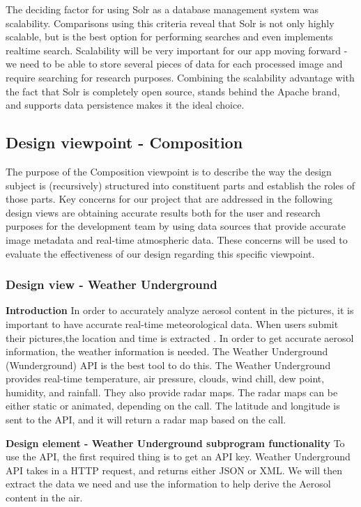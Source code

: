 \documentclass[onecolumn, draftclsnofoot,10pt, compsoc]{IEEEtran}
\begin{document}
\begin{flushleft}
\medskip

The deciding factor for using Solr as a database management system was scalability. Comparisons using this criteria reveal that Solr is not only highly scalable, but is the best option for performing searches and even implements realtime search. \cite{5} Scalability will be very important for our app moving forward - we need to be able to store several pieces of data for each processed image and require searching for research purposes. Combining the scalability advantage with the fact that Solr is completely open source, stands behind the Apache brand, and supports data persistence makes it the ideal choice.

\subsection{Design viewpoint - Composition}
The purpose of the Composition viewpoint is to describe the way the design subject is (recursively) structured into constituent parts and establish the roles of those parts.  Key concerns for our project that are addressed in the following design views are obtaining accurate results both for the user and research purposes for the development team by using data sources that provide accurate image metadata and real-time atmospheric data. These concerns will be used to evaluate the effectiveness of our design regarding this specific viewpoint.

\subsubsection{Design view - Weather Underground}
\textbf{Introduction} In order to accurately analyze aerosol content in the pictures, it is important to have accurate real-time meteorological data. When users submit their pictures,the location and time is extracted . In order to get accurate aerosol information, the weather information is needed. The Weather Underground (Wunderground) API is the best tool to do this. The Weather Underground provides real-time temperature, air pressure, clouds, wind chill, dew point, humidity, and rainfall. They also provide radar maps. The radar maps can be either static or animated, depending on the call. The latitude and longitude is sent to the API, and it will return a radar map based on the call. \cite{3}

\medskip

\textbf{Design element - Weather Underground subprogram functionality} To use the API, the first required thing is to get an API key. Weather Underground API takes in a HTTP request, and returns either JSON or XML. We will then extract the data we need and use the information to help derive the Aerosol content in the air. \cite{3}


\end{flushleft}
\end{document}
